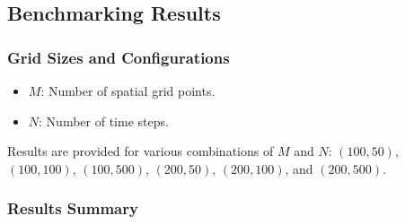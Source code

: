 \documentclass[12pt,a4paper]{report}
\begin{document}
\subsection{Benchmarking Results}

\subsubsection{Grid Sizes and Configurations}
\begin{itemize}
    \item \textbf{\(M\)}: Number of spatial grid points.
    \item \textbf{\(N\)}: Number of time steps.
\end{itemize}

Results are provided for various combinations of \(M\) and \(N\): \((100, 50)\), \((100, 100)\), \((100, 500)\), \((200, 50)\), \((200, 100)\), and \((200, 500)\).

\subsubsection{Results Summary}
\end{document}
